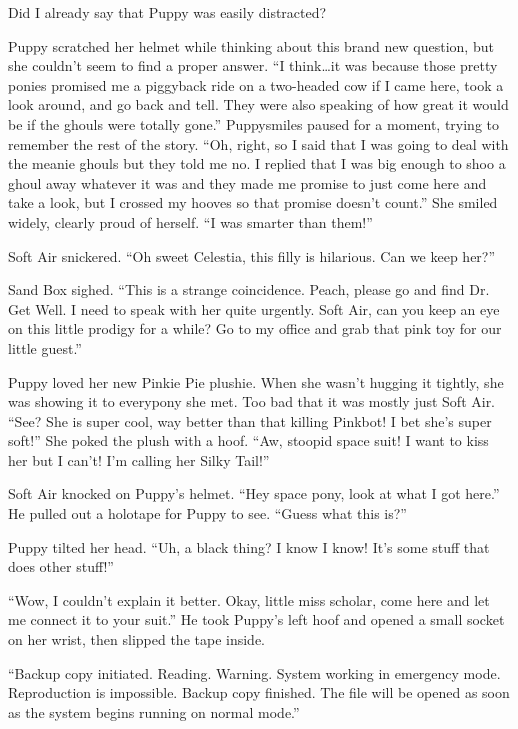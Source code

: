 Did I already say that Puppy was easily distracted?

Puppy scratched her helmet while thinking about this brand new question, but she couldn't seem to find a proper answer. ``I think\dots it was because those pretty ponies promised me a piggyback ride on a two-headed cow if I came here, took a look around, and go back and tell. They were also speaking of how great it would be if the ghouls were totally gone.'' Puppysmiles paused for a moment, trying to remember the rest of the story. ``Oh, right, so I said that I was going to deal with the meanie ghouls but they told me no. I replied that I was big enough to shoo a ghoul away whatever it was and they made me promise to just come here and take a look, but I crossed my hooves so that promise doesn't count.'' She smiled widely, clearly proud of herself. ``I was smarter than them!''

Soft Air snickered. ``Oh sweet Celestia, this filly is hilarious. Can we keep her?''

Sand Box sighed. ``This is a strange coincidence. Peach, please go and find Dr. Get Well. I need to speak with her quite urgently. Soft Air, can you keep an eye on this little prodigy for a while? Go to my office and grab that pink toy for our little guest.''


\horizonline


Puppy loved her new Pinkie Pie plushie. When she wasn't hugging it tightly, she was showing it to everypony she met. Too bad that it was mostly just Soft Air. ``See? She is super cool, way better than that killing Pinkbot! I bet she's super soft!'' She poked the plush with a hoof. ``Aw, stoopid space suit! I want to kiss her but I can't! I'm calling her Silky Tail!''

Soft Air knocked on Puppy's helmet. ``Hey space pony, look at what I got here.'' He pulled out a holotape for Puppy to see. ``Guess what this is?''

Puppy tilted her head. ``Uh, a black thing? I know I know! It's some stuff that does other stuff!''

``Wow, I couldn't explain it better. Okay, little miss scholar, come here and let me connect it to your suit.'' He took Puppy's left hoof and opened a small socket on her wrist, then slipped the tape inside.

{\mt ``Backup copy initiated. Reading. Warning. System working in emergency mode. Reproduction is impossible. Backup copy finished. The file will be opened as soon as the system begins running on normal mode.''}

